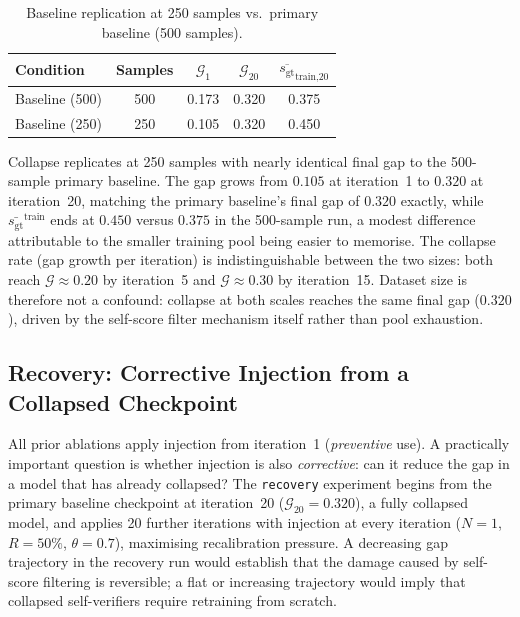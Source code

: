 \documentclass{article}
\newcommand{\gap}{\mathcal{G}}          %
\newcommand{\gt}{s_{\text{gt}}}         %
\begin{document}
\begin{table}[h]
\centering
\caption{Baseline replication at 250 samples vs.\ primary baseline (500 samples).}
\label{tab:baseline-250}
\small
\begin{tabular}{lcccc}
\toprule
Condition & Samples & $\gap_1$ & $\gap_{20}$ & $\overline{\gt}_\text{train,20}$ \\
\midrule
Baseline (500)  & 500 & 0.173 & 0.320 & 0.375 \\
Baseline (250)  & 250 & 0.105 & 0.320 & 0.450 \\
\bottomrule
\end{tabular}
\end{table}

Collapse replicates at 250 samples with nearly identical final gap to the 500-sample
primary baseline.
The gap grows from $0.105$ at iteration~1 to $0.320$ at iteration~20, matching the
primary baseline's final gap of $0.320$ exactly, while $\bar{\gt}^\text{train}$
ends at $0.450$ versus $0.375$ in the 500-sample run, a modest difference attributable
to the smaller training pool being easier to memorise.
The collapse rate (gap growth per iteration) is indistinguishable between the two sizes:
both reach $\gap \approx 0.20$ by iteration~5 and $\gap \approx 0.30$ by iteration~15.
Dataset size is therefore not a confound: collapse at both scales reaches the same
final gap ($0.320$), driven by the self-score filter mechanism itself rather than
pool exhaustion.

\subsection{Recovery: Corrective Injection from a Collapsed Checkpoint}
\label{sec:recovery}

All prior ablations apply injection from iteration~1 (\emph{preventive} use).
A practically important question is whether injection is also \emph{corrective}:
can it reduce the gap in a model that has already collapsed?
The \texttt{recovery} experiment begins from the primary baseline checkpoint at
iteration~20 ($\gap_{20} = 0.320$), a fully collapsed
model, and applies 20 further iterations with injection at every iteration ($N{=}1$, $R{=}50\%$,
$\theta{=}0.7$), maximising recalibration pressure.
A decreasing gap trajectory in the recovery run would establish that the damage caused by
self-score filtering is reversible; a flat or increasing trajectory would imply that
collapsed self-verifiers require retraining from scratch.
\end{document}

